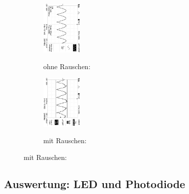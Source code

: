 \begin{figure}
\caption{$U_{out} (\phi = 340°$) }
\begin{subfigure}{0.48\textwidth}
\centering
\caption*{ohne Rauschen:}
\includegraphics[angle=90,height=2.6cm]{graphics/ALL0038/F0038TEK.jpg}
\label{fig:phi340o}
\end{subfigure}
\begin{subfigure}{0.48\textwidth}
\centering
\caption*{mit Rauschen:}
\includegraphics[angle=90,height=2.6cm]{graphics/ALL0046/F0046TEK.jpg}
\label{fig:phi340m}
\end{subfigure}
\label{fig:U_out}
\end{figure}
\addtocounter{figure}{-1}

\newpage

\captionsetup{labelformat=default}

\subsection{Auswertung: LED und Photodiode}

